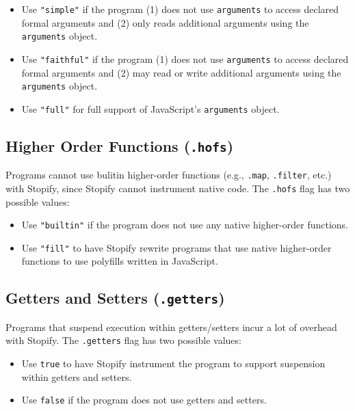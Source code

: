 \documentclass[10pt]{book}
\begin{document}
\begin{itemize}

  \item Use \lstinline|"simple"| if the program (1) does not use \lstinline|arguments| to
    access declared formal arguments and (2) only reads additional
    arguments using the \lstinline|arguments| object.

  \item Use \lstinline|"faithful"| if the program (1) does not use \lstinline|arguments|
    to access declared formal arguments and (2) may read or write additional
    arguments using the \lstinline|arguments| object.

  \item Use \lstinline|"full"| for full support of JavaScript's \lstinline|arguments| object.

\end{itemize}

\subsection{Higher Order Functions (\texttt{.hofs}) \label{hofs-flag}}

Programs cannot use bulitin higher-order functions (e.g., \lstinline|.map|,
\lstinline|.filter|, etc.) with Stopify, since Stopify cannot instrument native
code. The \lstinline|.hofs| flag has two possible values:

\begin{itemize}

  \item Use \lstinline|"builtin"| if the program does not use any native
  higher-order functions.

  \item Use \lstinline|"fill"| to have Stopify rewrite programs that use native
    higher-order functions to use polyfills written in JavaScript.

\end{itemize}

\subsection{Getters and Setters (\texttt{.getters})\label{getters-flag}}

Programs that suspend execution within getters/setters incur a lot of overhead
with Stopify. The \lstinline|.getters| flag has two possible values:

\begin{itemize}

  \item Use \lstinline|true| to have Stopify instrument the program to
  support suspension within getters and setters.

  \item Use \lstinline|false| if the program does not use getters and setters.

\end{itemize}
\end{document}
